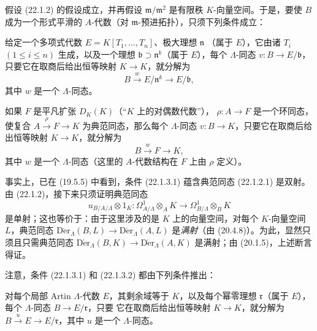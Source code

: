 \begin{remark}[22.1.3]
\label{0.22.1.3-fr}
假设 (22.1.2) 的假设成立，并再假设 $\mathfrak m/\mathfrak m^2$ 是有限秩
$K$-向量空间。于是，要使 $B$ 成为一个形式平滑的 $A$-代数（对
$\mathfrak m$-预进拓扑），只须下列条件成立：

\begin{env}[22.1.3.1]
\label{0.22.1.3.1-fr}
给定一个多项式代数 $E=K[T_1,\ldots,T_n]$、极大理想 $\mathfrak n$
（属于 $E$），它由诸 $T_i$ $(1\leqslant i\leqslant n)$ 生成，以及一个理想
$\mathfrak b\supset\mathfrak n^k$（属于 $E$），每个 $\Lambda$-同态
$v:B\to E/\mathfrak b$，只要它在取商后给出恒等映射 $K\to K$，就分解为
\[
  B\xrightarrow{w}E/\mathfrak n^k\longrightarrow E/\mathfrak b,
\]
其中 $w$ 是一个 $\Lambda$-同态。
\end{env}

\begin{env}[22.1.3.2]
\label{0.22.1.3.2-fr}
如果 $F$ 是平凡扩张 $D_K(K)$（“$K$ 上的对偶数代数”），
$\rho:A\to F$ 是一个环同态，使复合
$A\xrightarrow{\rho}F\to K$ 为典范同态，那么每个 $\Lambda$-同态
$v:B\to K$，只要它在取商后给出恒等映射 $K\to K$，就分解为
\[
  B\xrightarrow{w}F\longrightarrow K,
\]
其中 $w$ 是一个 $\Lambda$-同态（这里的 $A$-代数结构在 $F$ 上由 $\rho$
定义）。
\end{env}

事实上，已在 (19.5.5) 中看到，条件 (22.1.3.1) 蕴含典范同态
(22.1.2.1) 是双射。由 (22.1.2)，接下来只须证明典范同态
\[
  u_{B/A/\Lambda}\otimes1_K:
  \Omega^1_{A/\Lambda}\otimes_AK
  \longrightarrow\Omega^1_{B/\Lambda}\otimes_BK
\]
是单射；这也等价于：由于这里涉及的是 $K$ 上的向量空间，对每个
$K$-向量空间 $L$，典范同态
$\operatorname{D\acute{e}r}_\Lambda(B,L)\to\operatorname{D\acute{e}r}_\Lambda(A,L)$
是\emph{满射}（由 (20.4.8)）。为此，显然只须且只需典范同态
$\operatorname{D\acute{e}r}_\Lambda(B,K)\to\operatorname{D\acute{e}r}_\Lambda(A,K)$
是满射；由 (20.1.5)，上述断言得证。

注意，条件 (22.1.3.1) 和 (22.1.3.2) 都由下列条件推出：

\begin{env}[22.1.3.3]
\label{0.22.1.3.3-fr}
对每个局部 Artin $\Lambda$-代数 $E$，其剩余域等于 $K$，以及每个幂零理想
$\mathfrak r$（属于 $E$），每个 $\Lambda$-同态 $B\to E/\mathfrak r$，只要
它在取商后给出恒等映射 $K\to K$，就分解为
$B\xrightarrow{u}E\to E/\mathfrak r$，其中 $u$ 是一个
$\Lambda$-同态。
\end{env}
\end{remark}


